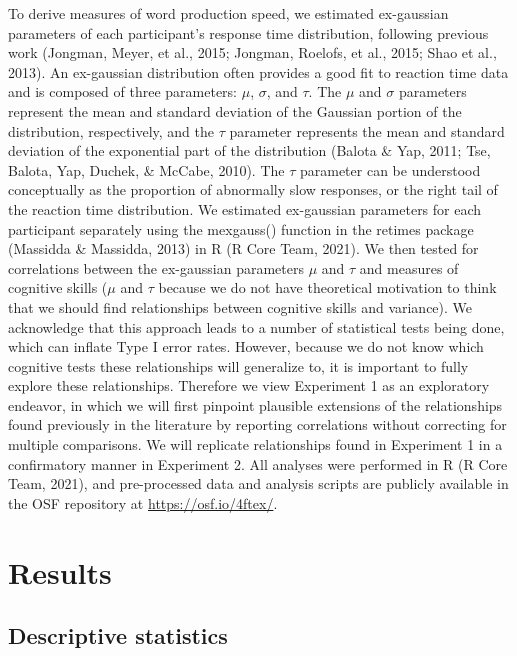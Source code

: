 \documentclass[
  man,floatsintext]{apa6}
\begin{document}
To derive measures of word production speed, we estimated ex-gaussian parameters of each participant's response time distribution, following previous work (Jongman, Meyer, et al., 2015; Jongman, Roelofs, et al., 2015; Shao et al., 2013). An ex-gaussian distribution often provides a good fit to reaction time data and is composed of three parameters: \(\mu\), \(\sigma\), and \(\tau\). The \(\mu\) and \(\sigma\) parameters represent the mean and standard deviation of the Gaussian portion of the distribution, respectively, and the \(\tau\) parameter represents the mean and standard deviation of the exponential part of the distribution (Balota \& Yap, 2011; Tse, Balota, Yap, Duchek, \& McCabe, 2010). The \(\tau\) parameter can be understood conceptually as the proportion of abnormally slow responses, or the right tail of the reaction time distribution. We estimated ex-gaussian parameters for each participant separately using the mexgauss() function in the retimes package (Massidda \& Massidda, 2013) in R (R Core Team, 2021). We then tested for correlations between the ex-gaussian parameters \(\mu\) and \(\tau\) and measures of cognitive skills (\(\mu\) and \(\tau\) because we do not have theoretical motivation to think that we should find relationships between cognitive skills and variance). We acknowledge that this approach leads to a number of statistical tests being done, which can inflate Type I error rates. However, because we do not know which cognitive tests these relationships will generalize to, it is important to fully explore these relationships. Therefore we view Experiment 1 as an exploratory endeavor, in which we will first pinpoint plausible extensions of the relationships found previously in the literature by reporting correlations without correcting for multiple comparisons. We will replicate relationships found in Experiment 1 in a confirmatory manner in Experiment 2. All analyses were performed in R (R Core Team, 2021), and pre-processed data and analysis scripts are publicly available in the OSF repository at \url{https://osf.io/4ftex/}.

\hypertarget{results}{%
\section{Results}\label{results}}

\hypertarget{descriptive-statistics}{%
\subsection{Descriptive statistics}\label{descriptive-statistics}}
\end{document}
